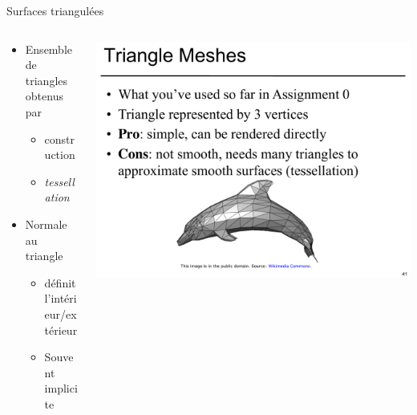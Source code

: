 \begin{frame}{Surfaces triangulées}
\begin{columns}
\begin{column}{.6\textwidth}
\begin{itemize}
\item Ensemble de triangles obtenus par
\begin{itemize}
\item construction
\item \textit{tessellation}
\end{itemize}
\item Normale au triangle
\begin{itemize}
\item définit l'intérieur/extérieur
\item Souvent implicite
\end{itemize}
\end{itemize}
\end{column}
\begin{column}{.39\textwidth}
\includegraphics[width=\textwidth]{figs/dauphin.pdf}
\end{column}
\end{columns}
\end{frame}

